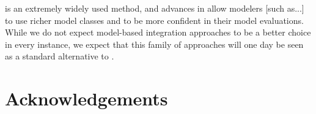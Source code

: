 \documentclass{article}
\begin{document}
 is an extremely widely used method, and advances in  allow modelers [such as...] to use richer model classes and to be more confident in their model evaluations.  While we do not expect model-based integration approaches to be a better choice in every instance, we expect that this family of approaches will one day be seen as a standard alternative to .

\section*{Acknowledgements}



\pagebreak


\end{document}
